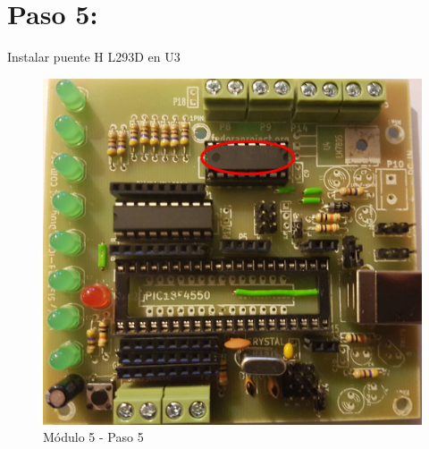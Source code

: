 \newpage

\section{Paso 5:}

Instalar puente H L293D en U3

\begin{figure}[h]
	\centering
	\includegraphics[width=0.8\linewidth]{Modulo_5/M5_5}
	\caption{Módulo 5 - Paso 5}
	\label{fig:M5_5}
\end{figure}